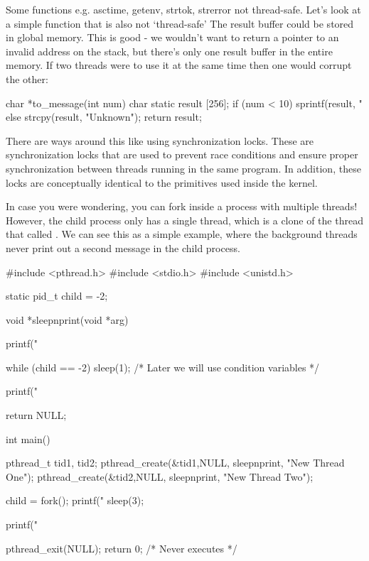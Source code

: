 Some functions e.g. asctime, getenv, strtok, strerror not thread-safe. Let's look at a simple function that is also not `thread-safe' The result buffer could be stored in global memory. This is good - we wouldn't want to return a pointer to an invalid address on the stack, but there's only one result buffer in the entire memory. If two threads were to use it at the same time then one would corrupt the other:

\begin{code}[language=C]
char *to_message(int num) {
    char static result [256];
    if (num < 10) sprintf(result, "%
    else strcpy(result, "Unknown");
    return result;
}
\end{code}

There are ways around this like using synchronization locks. These are synchronization locks that are used to prevent race conditions and ensure proper synchronization between threads running in the same program. In addition, these locks are conceptually identical to the primitives used inside the kernel.

In case you were wondering, you can fork inside a process with multiple threads! However, the child process only has a single thread, which is a clone of the thread that called . We can see this as a simple example, where the background threads never print out a second message in the child process.

\begin{code}[language=C]
#include <pthread.h>
#include <stdio.h>
#include <unistd.h>

static pid_t child = -2;

void *sleepnprint(void *arg) {
  printf("%

  while (child == -2) {sleep(1);} /* Later we will use condition variables */

  printf("%

  return NULL;  
}
int main() {
  pthread_t tid1, tid2;
  pthread_create(&tid1,NULL, sleepnprint, "New Thread One");
  pthread_create(&tid2,NULL, sleepnprint, "New Thread Two");
  
  child = fork();
  printf("%
  sleep(3);
    
  printf("%
  
  pthread_exit(NULL);
  return 0; /* Never executes */
}
\end{code}

